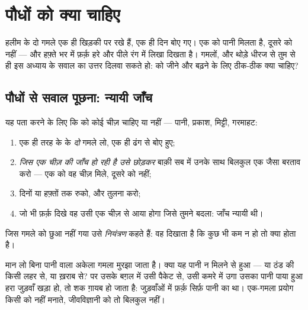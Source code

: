 \chapter{पौधों को क्या चाहिए}\label{ch:g4:what-plants-need}

हलीम के दो गमले एक ही खिड़की पर रखे हैं, एक ही दिन बोए गए। एक को पानी
मिलता है, दूसरे को नहीं --- और हफ़्ते भर में फ़र्क़ हरे और पीले रंग में
लिखा दिखता है। गमलों,  और थोड़े धीरज से तुम  से ही इस अध्याय
के सवाल का उत्तर दिलवा सकते हो:  को जीने और बढ़ने के लिए ठीक-ठीक
क्या चाहिए?

\section{पौधों से सवाल पूछना: न्यायी जाँच}

\begin{method}[न्यायी जाँच]\label{met:g4:what-plants-need:fairtest}
यह पता करने के लिए कि  को कोई चीज़ चाहिए या नहीं --- पानी, प्रकाश,
मिट्टी, गरमाहट:
\begin{enumerate}
  \item एक ही तरह के  के \emph{दो} गमले लो, एक ही ढंग से बोए
        हुए;
  \item \emph{जिस एक चीज़ की जाँच हो रही है उसे छोड़कर} बाक़ी सब में
        उनके साथ बिलकुल एक जैसा बरताव करो --- एक को वह चीज़ मिले,
        दूसरे को नहीं;
  \item दिनों या हफ़्तों तक रुको, और तुलना करो;
  \item जो भी फ़र्क़ दिखे वह उसी एक चीज़ से आया होगा जिसे तुमने बदला:
        जाँच न्यायी थी।
\end{enumerate}
जिस गमले को छुआ नहीं गया उसे \emph{नियंत्रण}
कहते हैं: वह दिखाता है कि कुछ भी कम न हो तो क्या होता है।
\end{method}

\begin{example}[एक नहीं, दो गमले क्यों]\label{ex:g4:what-plants-need:control}
मान लो बिना पानी वाला अकेला गमला मुरझा जाता है। क्या यह पानी न मिलने
से हुआ --- या ठंड की किसी लहर से, या ख़राब  से? पर उसके बग़ल में
उसी पैकेट से, उसी कमरे में उगा उसका पानी पाया हुआ हरा जुड़वाँ खड़ा हो,
तो शक ग़ायब हो जाता है: जुड़वाँओं में फ़र्क़ सिर्फ़ पानी का था। एक-गमला
प्रयोग किसी को नहीं मनाते, जीवविज्ञानी को तो बिलकुल नहीं।
\end{example}


